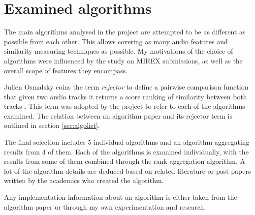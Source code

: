 
\chapter{Examined algorithms}
\label{chap:algorithms}
\ifpdf
    \graphicspath{{Algorithms/Figures/PNG/}{EvaluationTask/Figures/PDF/}{Algorithms/Figures/}}
\else
    \graphicspath{{Algorithms/Figures/EPS/}{EvaluationTask/Figures/}}
\fi


The main algorithms analysed in the project are attempted to be as different as
possible from each other. This allows covering as many audio features and
similarity measuring techniques as possible. My motivations of the choice of
algorithms were influenced by the study on MIREX submissions, as well as the
overall scope of features they encompass. 

Julien Osmalsky coins the term \textit{rejector} to define a pairwise comparison
function that given two audio tracks it returns a score ranking of similarity
between both tracks \cite{osmalsky2015combining}. This term was adopted by the
project to refer to each of the algorithms examined. The relation between an
algorithm paper and its rejector term is outlined in section \ref{sec:algolist}.

The final selection includes 5 individual algorithms and an algorithm
aggregating results from 4 of them. Each of the algorithms is examined
individually, with the results from some of them combined through the rank
aggregation algorithm. A lot of the algorithm details are deduced based on
related literature or past papers written by the academics who created the algorithm.

Any implementation information about an algorithm is either taken from the
algorithm paper or through my own experimentation and research.

